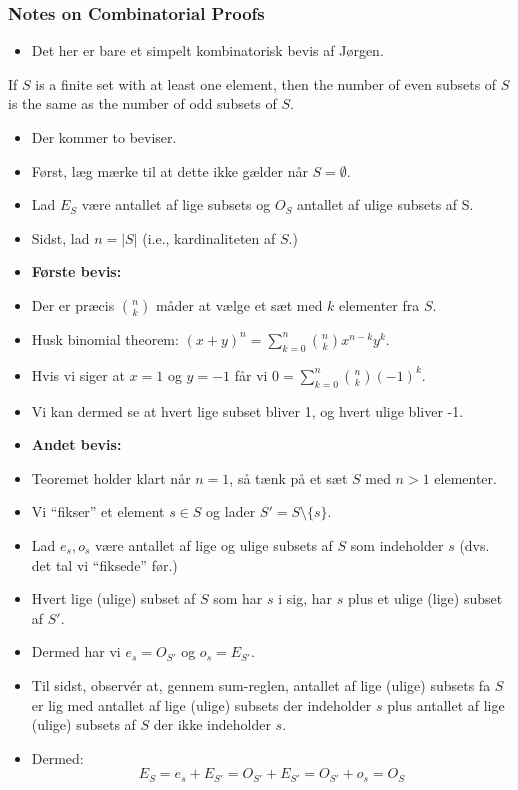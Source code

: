 \documentclass{beamer}
\begin{document}
\begin{frame}[allowframebreaks]
  \frametitle{Notes on Combinatorial Proofs}
 \begin{itemize}
 \item Det her er bare et simpelt kombinatorisk bevis af Jørgen. 
 \end{itemize} 
 \begin{theorem}
If $S$ is a finite set with at least one element, then the number of even subsets of $S$ is the same as the number of odd subsets of $S$.
 \end{theorem}
 \begin{itemize}
 \item Der kommer to beviser. 
 \item Først, læg mærke til at dette ikke gælder når $S = \emptyset$.
 \item Lad $E_{S}$  være antallet af lige subsets og $O_{S}$ antallet af ulige subsets af S. 
 \item Sidst, lad $n = |S|$ (i.e., kardinaliteten af $S$.)
 \item \textbf{Første bevis:}
 \item Der er præcis $\binom{n}{k}$ måder at vælge et sæt med $k$ elementer fra $S$.
 \item Husk binomial theorem: $(x+y)^{n} = \sum_{k=0}^{n} \binom{n}{k}x^{n-k}y^{ k}$.
 \item Hvis vi siger at $x = 1$ og $y = -1$ får vi $0 = \sum_{k=0}^{n} \binom{n}{k} (-1)^{k}$. 
 \item Vi kan dermed se at hvert lige subset bliver 1, og hvert ulige bliver -1.
 \item \textbf{Andet bevis:}
 \item Teoremet holder klart når $n=1$, så tænk på et sæt $S$ med $n > 1$ elementer. 
 \item Vi ``fikser'' et element $s \in S$ og lader $S' = S \setminus \{s\}$. 
 \item Lad $e_{s}, o_{s}$ være antallet af lige og ulige subsets af $S$ som indeholder $s$ (dvs. det tal vi ``fiksede'' før.)
 \item Hvert lige (ulige) subset af $S$ som har $s$ i sig, har $s$ plus et ulige (lige) subset af $S'$. 
 \item Dermed har vi $e_{s} = O_{S'}$ og $o_{s} = E_{S'}$. 
 \item Til sidst, observér at, gennem sum-reglen, antallet af lige (ulige) subsets fa $S$ er lig med antallet af lige (ulige) subsets der indeholder $s$ plus antallet af lige (ulige) subsets af $S$ der ikke indeholder $s$. 
 \item Dermed: \[ E_{S} = e_{s} + E_{S'} = O_{S'} + E_{S'} = O_{S'} + o_{s} = O_{S} \]
 \end{itemize}
\end{frame}
\end{document}
